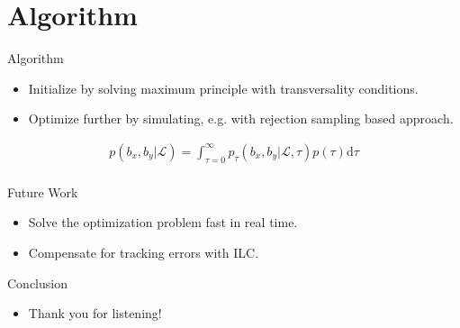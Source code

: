 \documentclass[handout]{beamer}
\newcommand{\landTime}{\tau} %
\newcommand{\landEvent}{\mathcal{L}} %
\newcommand{\landDist}{p(\tau)} %
\begin{document}
\section{Algorithm}
%
\begin{frame}{Algorithm}
\begin{itemize}
\item Initialize by solving maximum principle with transversality conditions.
\item Optimize further by simulating, e.g. with rejection sampling based approach.
\end{itemize}
\begin{align}
p(b_x,b_y|\landEvent) = \int_{\landTime = 0}^{\infty} p_{\landTime}(b_x,b_y|\landEvent,\landTime)\landDist \textrm{d}\landTime
\label{marginalProcess} \\
\end{align}
\end{frame}
%
\begin{frame}{Future Work}
\begin{itemize}
\item Solve the optimization problem fast in real time.
\item Compensate for tracking errors with ILC.
\end{itemize}
\end{frame}
%
\begin{frame}{Conclusion}
\begin{itemize}
\item Thank you for listening!
\end{itemize}
\end{frame}	
%
%
%

%
\end{document}
